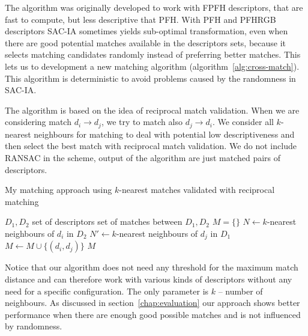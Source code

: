 
The algorithm was originally developed to work with \gls{FPFH} descriptors, that are fast to compute, but less descriptive that \gls{PFH}. With \gls{PFH} and \gls{PFHRGB} descriptors \gls{SAC-IA} sometimes yields sub-optimal transformation, even when there are good potential matches available in the descriptors sets, because it selects matching candidates randomly instead of preferring better matches. This lets us to development a new matching algorithm (algorithm~\ref{alg:cross-match}). This algorithm is deterministic to avoid problems caused by the randomness in \gls{SAC-IA}.

The algorithm is based on the idea of reciprocal match validation. When we are considering match $d_i \rightarrow d_j$, we try to match also $d_j \rightarrow d_i$. We consider all $k$-nearest neighbours for matching to deal with potential low descriptiveness and then select the best match with reciprocal match validation. We do not include \gls{RANSAC} in the scheme, output of the algorithm are just matched pairs of descriptors.

\begin{algorithm}
    \caption[Reciprocal $k$-nearest matching]{My matching approach using $k$-nearest matches validated with reciprocal matching}
    \label{alg:cross-match}
    \begin{algorithmic}[1]
        \Require $D_1, D_2$ set of descriptors
        \Ensure set of matches between $D_1, D_2$
            \State $M = \{\}$
                \State $N \gets k$-nearest neighbours of $d_i$ in $D_2$
                    \State $N' \gets k$-nearest neighbours of $d_j$ in $D_1$
                        \State $M \gets M \cup \{(d_i, d_j)\}$
                    \EndIf
                \EndFor
            \EndFor
            \State \Return $M$
        \EndFunction
    \end{algorithmic}
\end{algorithm}

Notice that our algorithm does not need any threshold for the maximum match distance and can therefore work with various kinds of descriptors without any need for a specific configuration. The only parameter is $k$ -- number of neighbours. As discussed in section~\ref{chap:evaluation} our approach shows better performance when there are enough good possible matches and is not influenced by randomness.

